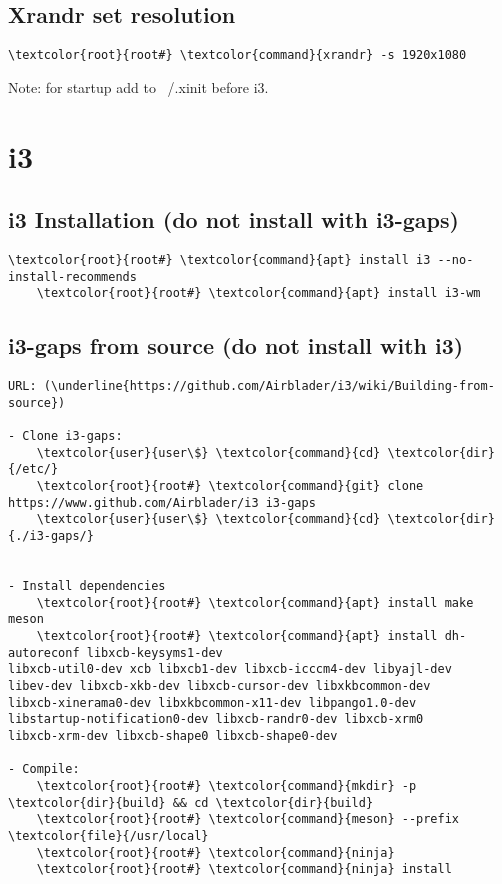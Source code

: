 \documentclass[10pt, a4paper, onecolumn, openany]{book} %
\begin{document}
\subsection{Xrandr set resolution}
\begin{Verbatim}[commandchars=\\\{\}]
    \textcolor{root}{root#} \textcolor{command}{xrandr} -s 1920x1080
\end{Verbatim}
Note: for startup add to \textcolor{file}{~/.xinit} before i3.

\section{i3}
\subsection{i3 Installation (do not install with i3-gaps)}
\begin{Verbatim}[commandchars=\\\{\}]
    \textcolor{root}{root#} \textcolor{command}{apt} install i3 --no-install-recommends
    \textcolor{root}{root#} \textcolor{command}{apt} install i3-wm 
\end{Verbatim}
\subsection{i3-gaps from source (do not install with i3)}
\begin{Verbatim}[commandchars=\\\{\}]
URL: (\underline{https://github.com/Airblader/i3/wiki/Building-from-source})

- Clone i3-gaps:
    \textcolor{user}{user\$} \textcolor{command}{cd} \textcolor{dir}{/etc/}
    \textcolor{root}{root#} \textcolor{command}{git} clone https://www.github.com/Airblader/i3 i3-gaps
    \textcolor{user}{user\$} \textcolor{command}{cd} \textcolor{dir}{./i3-gaps/}


- Install dependencies
    \textcolor{root}{root#} \textcolor{command}{apt} install make meson
    \textcolor{root}{root#} \textcolor{command}{apt} install dh-autoreconf libxcb-keysyms1-dev 
libxcb-util0-dev xcb libxcb1-dev libxcb-icccm4-dev libyajl-dev
libev-dev libxcb-xkb-dev libxcb-cursor-dev libxkbcommon-dev 
libxcb-xinerama0-dev libxkbcommon-x11-dev libpango1.0-dev
libstartup-notification0-dev libxcb-randr0-dev libxcb-xrm0 
libxcb-xrm-dev libxcb-shape0 libxcb-shape0-dev

- Compile:
    \textcolor{root}{root#} \textcolor{command}{mkdir} -p \textcolor{dir}{build} && cd \textcolor{dir}{build}
    \textcolor{root}{root#} \textcolor{command}{meson} --prefix \textcolor{file}{/usr/local}
    \textcolor{root}{root#} \textcolor{command}{ninja}
    \textcolor{root}{root#} \textcolor{command}{ninja} install
\end{Verbatim}
\end{document}
